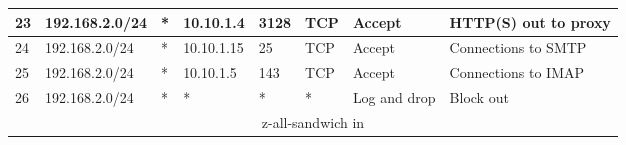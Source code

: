\documentclass[a4paper, 11pt, oneside]{article}
\begin{document}
\begin{table}[H]
{\begin{tabular}{|llllllll|}
\multicolumn{1}{|l|}{23}                        & \multicolumn{1}{l|}{192.168.2.0/24}                                               & \multicolumn{1}{l|}{*}                                                              & \multicolumn{1}{l|}{10.10.1.4}                                                         & \multicolumn{1}{l|}{3128}                                                                & \multicolumn{1}{l|}{TCP}               & \multicolumn{1}{l|}{Accept}          & HTTP(S) out to proxy                   \\ \hline
\multicolumn{1}{|l|}{24}                        & \multicolumn{1}{l|}{192.168.2.0/24}                                               & \multicolumn{1}{l|}{*}                                                              & \multicolumn{1}{l|}{10.10.1.15}                                                        & \multicolumn{1}{l|}{25}                                                                  & \multicolumn{1}{l|}{TCP}               & \multicolumn{1}{l|}{Accept}          & Connections to SMTP                    \\ \hline
\multicolumn{1}{|l|}{25}                        & \multicolumn{1}{l|}{192.168.2.0/24}                                               & \multicolumn{1}{l|}{*}                                                              & \multicolumn{1}{l|}{10.10.1.5}                                                         & \multicolumn{1}{l|}{143}                                                                 & \multicolumn{1}{l|}{TCP}               & \multicolumn{1}{l|}{Accept}          & Connections to IMAP                    \\ \hline
\multicolumn{1}{|l|}{26}                        & \multicolumn{1}{l|}{192.168.2.0/24}                                               & \multicolumn{1}{l|}{*}                                                              & \multicolumn{1}{l|}{*}                                                                 & \multicolumn{1}{l|}{*}                                                                   & \multicolumn{1}{l|}{*}                 & \multicolumn{1}{l|}{Log and drop}    & Block out                              \\ \hline
\multicolumn{8}{|c|}{{\color[HTML]{FE0000} z-all-sandwich in}}                                                                                                                                                                                                                                                                                                                                                                                                                                                                         \\ \hline

\end{tabular}}
\end{table}
\end{document}
